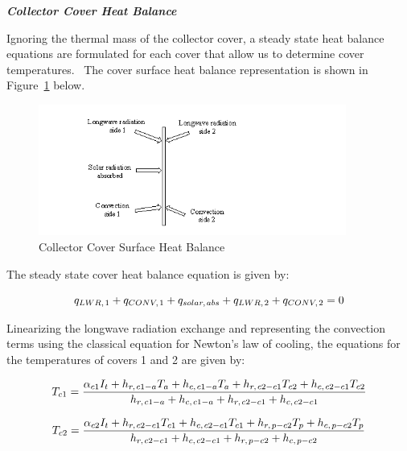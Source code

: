 \textbf{\emph{Collector Cover Heat Balance}}

Ignoring the thermal mass of the collector cover, a steady state heat balance equations are formulated for each cover that allow us to determine cover temperatures.~ The cover surface heat balance representation is shown in Figure~\ref{fig:collector-cover-surface-heat-balance} below.

\begin{figure}[hbtp] %
\centering
\includegraphics[width=0.9\textwidth, height=0.9\textheight, keepaspectratio=true]{media/image6523.png}
\caption{Collector Cover Surface Heat Balance \protect \label{fig:collector-cover-surface-heat-balance}}
\end{figure}

The steady state cover heat balance equation is given by:

\begin{equation}
{q_{LWR,{\kern 1pt} 1}} + {q_{CONV,{\kern 1pt} 1}} + {q_{solar,{\kern 1pt} abs}} + {q_{LWR,{\kern 1pt} 2}} + {q_{CONV,{\kern 1pt} 2}} = 0
\end{equation}

Linearizing the longwave radiation exchange and representing the convection terms using the classical equation for Newton's law of cooling, the equations for the temperatures of covers 1 and 2 are given by:

\begin{equation}
{T_{c{\rm{1}}}} = \frac{{{\alpha_{c1}}{I_t} + {h_{r,{\kern 1pt} c1 - a}}{T_a} + {h_{c,{\kern 1pt} c1 - a}}{T_a} + {h_{r,{\kern 1pt} c2 - c1}}{T_{c2}} + {h_{c,{\kern 1pt} c2 - c1}}{T_{c2}}}}{{{h_{r,{\kern 1pt} c1 - a}} + {h_{c,{\kern 1pt} c1 - a}} + {h_{r,{\kern 1pt} c2 - c1}} + {h_{c,{\kern 1pt} c2 - c1}}}}
\end{equation}

\begin{equation}
{T_{c2}} = \frac{{{\alpha_{c2}}{I_t} + {h_{r,{\kern 1pt} c2 - c1}}{T_{c1}} + {h_{c,{\kern 1pt} c2 - c1}}{T_{c1}} + {h_{r,{\kern 1pt} p - c2}}{T_p} + {h_{c,{\kern 1pt} p - c2}}{T_p}}}{{{h_{r,{\kern 1pt} c2 - c1}} + {h_{c,{\kern 1pt} c2 - c1}} + {h_{r,{\kern 1pt} p - c2}} + {h_{c,{\kern 1pt} p - c2}}}}
\end{equation}

